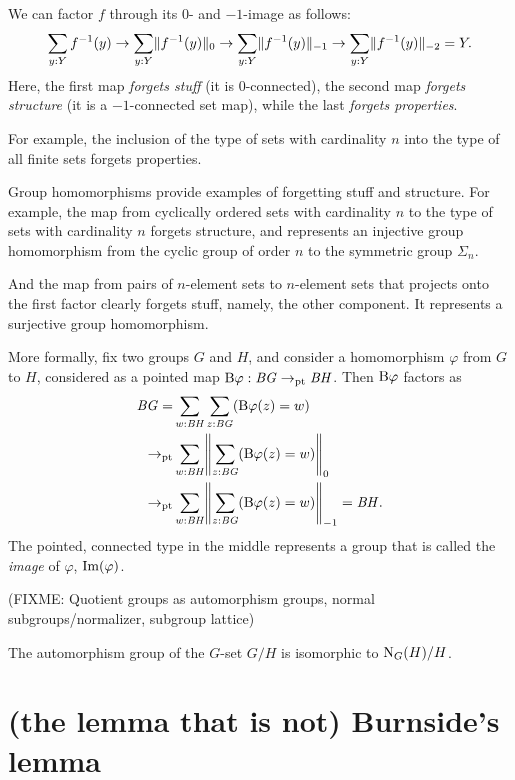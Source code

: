 We can factor $f$ through its $0$- and $-1$-image as follows:
\[
  \sum_{y:Y} f^{-1}(y) \to
  \sum_{y:Y} \lVert f^{-1}(y)\rVert_0 \to
  \sum_{y:Y} \lVert f^{-1}(y)\rVert_{-1} \to
  \sum_{y:Y} \lVert f^{-1}(y)\rVert_{-2} = Y.
\]
Here, the first map \emph{forgets stuff} (it is $0$-connected),
the second map \emph{forgets structure} (it is a $-1$-connected set map),
while the last \emph{forgets properties}.

For example, the inclusion of the type of sets with cardinality
$n$ into the type of all finite sets
forgets properties.

Group homomorphisms provide examples of forgetting stuff and structure.
For example, the map from cyclically ordered sets with cardinality $n$
to the type of sets with cardinality $n$ forgets structure,
and represents an injective group homomorphism from the cyclic
group of order $n$ to the symmetric group $\Sigma_n$.

And the map from pairs of $n$-element sets to $n$-element sets
that projects onto the first factor clearly forgets stuff,
namely, the other component.
It represents a surjective group homomorphism.

More formally, fix two groups $G$ and $H$,
and consider a homomorphism $\varphi$ from $G$ to $H$,
considered as a pointed map $\mathrm{B}\varphi : \mathit{B}\mathit{G} \to_{\mathrm{pt}} \mathit{B}\mathit{H}$.
Then $\mathrm{B}\varphi$ factors as
\begin{align*}
  \BG
  = &\sum_{w:\BH}\sum_{z:\BG}(\B\varphi(z)=w)\\
  \to_\pt &\sum_{w:\BH}\Trunc*{\sum_{z:\BG}(\B\varphi(z)=w)}_0\\
  \to_\pt &\sum_{w:\BH}\Trunc*{\sum_{z:\BG}(\B\varphi(z)=w)}_{-1} = \BH.
\end{align*}
The pointed, connected type in the middle represents a group
that is called the \emph{image} of $\varphi$, $\Img(\varphi)$.


(FIXME: Quotient groups as automorphism groups, normal subgroups/normalizer, subgroup lattice)

\begin{lemma}
  \label{lem:aut-orbit}
  The automorphism group of the $G$-set $G/H$ is isomorphic to $\mathrm{N}_G(H)/H$.
\end{lemma}

\section{(the lemma that is not) Burnside's lemma}
\label{sec:burnsides-lemma}
\label{lem:burnsides-lemma}


